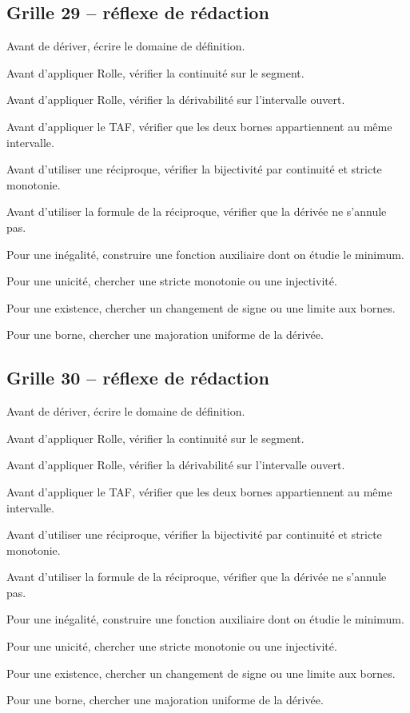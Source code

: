 \documentclass[11pt,a4paper]{article}
\begin{document}
\subsection*{Grille 29 -- réflexe de rédaction}

\begin{methodebox}

Avant de dériver, écrire le domaine de définition.

Avant d'appliquer Rolle, vérifier la continuité sur le segment.

Avant d'appliquer Rolle, vérifier la dérivabilité sur l'intervalle ouvert.

Avant d'appliquer le TAF, vérifier que les deux bornes appartiennent au même intervalle.

Avant d'utiliser une réciproque, vérifier la bijectivité par continuité et stricte monotonie.

Avant d'utiliser la formule de la réciproque, vérifier que la dérivée ne s'annule pas.

Pour une inégalité, construire une fonction auxiliaire dont on étudie le minimum.

Pour une unicité, chercher une stricte monotonie ou une injectivité.

Pour une existence, chercher un changement de signe ou une limite aux bornes.

Pour une borne, chercher une majoration uniforme de la dérivée.

\end{methodebox}

\subsection*{Grille 30 -- réflexe de rédaction}

\begin{methodebox}

Avant de dériver, écrire le domaine de définition.

Avant d'appliquer Rolle, vérifier la continuité sur le segment.

Avant d'appliquer Rolle, vérifier la dérivabilité sur l'intervalle ouvert.

Avant d'appliquer le TAF, vérifier que les deux bornes appartiennent au même intervalle.

Avant d'utiliser une réciproque, vérifier la bijectivité par continuité et stricte monotonie.

Avant d'utiliser la formule de la réciproque, vérifier que la dérivée ne s'annule pas.

Pour une inégalité, construire une fonction auxiliaire dont on étudie le minimum.

Pour une unicité, chercher une stricte monotonie ou une injectivité.

Pour une existence, chercher un changement de signe ou une limite aux bornes.

Pour une borne, chercher une majoration uniforme de la dérivée.

\end{methodebox}
\end{document}
